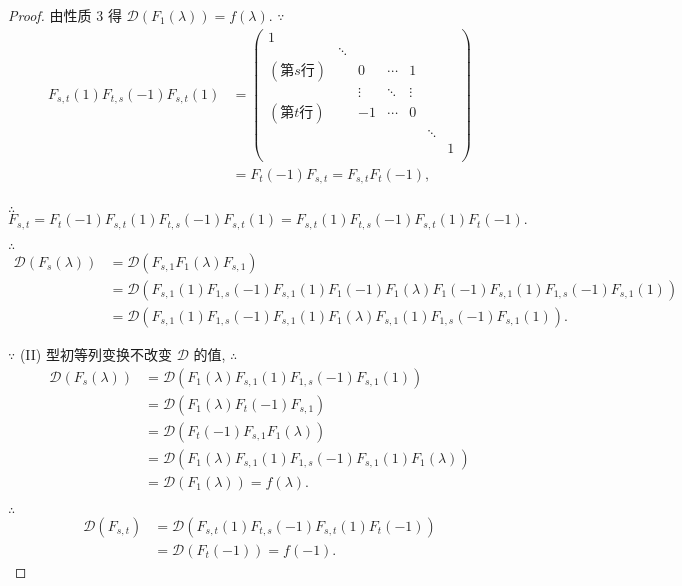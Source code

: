 \documentclass{ctexart}
\begin{document}
\begin{proof}
    由性质 3 得 $\mathcal{D}(F_1(\lambda))=f(\lambda)$. $\because$
    \begin{align*}
        F_{s,t}(1)F_{t,s}(-1)F_{s,t}(1) & =\begin{pmatrix}
            1\\
            & \ddots \\
            (\text{第}s\text{行}) && 0 & \cdots & 1 \\
            && \vdots & \ddots & \vdots \\
            (\text{第}t\text{行}) && -1 & \cdots & 0 \\
            &&&&& \ddots \\
            &&&&&& 1 \\
        \end{pmatrix} \\
        & =F_t(-1)F_{s,t}=F_{s,t}F_t(-1), \\
    \end{align*}

    $\therefore$
    \[F_{s,t}=F_t(-1)F_{s,t}(1)F_{t,s}(-1)F_{s,t}(1)=F_{s,t}(1)F_{t,s}(-1)F_{s,t}(1)F_t(-1).\]

    $\therefore$
    \begin{align*}
        \mathcal{D}(F_s(\lambda)) & =\mathcal{D}(F_{s,1}F_1(\lambda)F_{s,1}) \\
        & =\mathcal{D}(F_{s,1}(1)F_{1,s}(-1)F_{s,1}(1)F_1(-1)F_1(\lambda)F_1(-1)F_{s,1}(1)F_{1,s}(-1)F_{s,1}(1)) \\
        & =\mathcal{D}(F_{s,1}(1)F_{1,s}(-1)F_{s,1}(1)F_1(\lambda)F_{s,1}(1)F_{1,s}(-1)F_{s,1}(1)).
    \end{align*}

    $\because$ (II) 型初等列变换不改变 $\mathcal{D}$ 的值, $\therefore$
    \begin{align*}
        \mathcal{D}(F_s(\lambda)) & =\mathcal{D}(F_1(\lambda)F_{s,1}(1)F_{1,s}(-1)F_{s,1}(1)) \\
        & =\mathcal{D}(F_1(\lambda)F_t(-1)F_{s,1}) \\
        & =\mathcal{D}(F_t(-1)F_{s,1}F_1(\lambda)) \\
        & =\mathcal{D}(F_1(\lambda)F_{s,1}(1)F_{1,s}(-1)F_{s,1}(1)F_1(\lambda)) \\
        & =\mathcal{D}(F_1(\lambda))=f(\lambda).
    \end{align*}

    $\therefore$
    \begin{align*}
        \mathcal{D}(F_{s,t}) & =\mathcal{D}(F_{s,t}(1)F_{t,s}(-1)F_{s,t}(1)F_t(-1)) \\
        & =\mathcal{D}(F_t(-1))=f(-1).
    \end{align*}
\end{proof}
\end{document}

